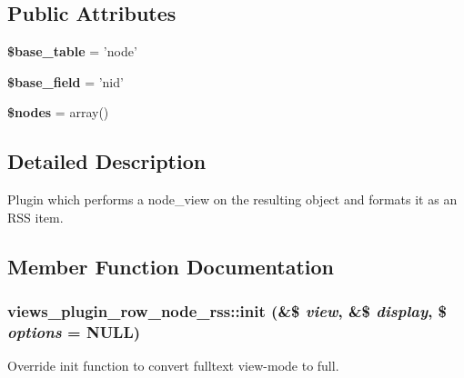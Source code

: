 \subsection*{Public Attributes}
\begin{DoxyCompactItemize}
\item 
\hypertarget{classviews__plugin__row__node__rss_af8bf642a869b63e8f935f799c94983fc}{
{\bfseries \$base\_\-table} = 'node'}
\label{classviews__plugin__row__node__rss_af8bf642a869b63e8f935f799c94983fc}

\item 
\hypertarget{classviews__plugin__row__node__rss_adee98801f4e3d6a5c91a56bb51e408aa}{
{\bfseries \$base\_\-field} = 'nid'}
\label{classviews__plugin__row__node__rss_adee98801f4e3d6a5c91a56bb51e408aa}

\item 
\hypertarget{classviews__plugin__row__node__rss_a27ec13867cbed0d81778ed689f6317f2}{
{\bfseries \$nodes} = array()}
\label{classviews__plugin__row__node__rss_a27ec13867cbed0d81778ed689f6317f2}

\end{DoxyCompactItemize}


\subsection{Detailed Description}
Plugin which performs a node\_\-view on the resulting object and formats it as an RSS item. 

\subsection{Member Function Documentation}
\hypertarget{classviews__plugin__row__node__rss_a6abed6bfad84d5caca74f5dba8911437}{
\subsubsection[{init}]{\setlength{\rightskip}{0pt plus 5cm}views\_\-plugin\_\-row\_\-node\_\-rss::init (\&\$ {\em view}, \/  \&\$ {\em display}, \/  \$ {\em options} = {\ttfamily NULL})}}
\label{classviews__plugin__row__node__rss_a6abed6bfad84d5caca74f5dba8911437}
Override init function to convert fulltext view-\/mode to full. 

